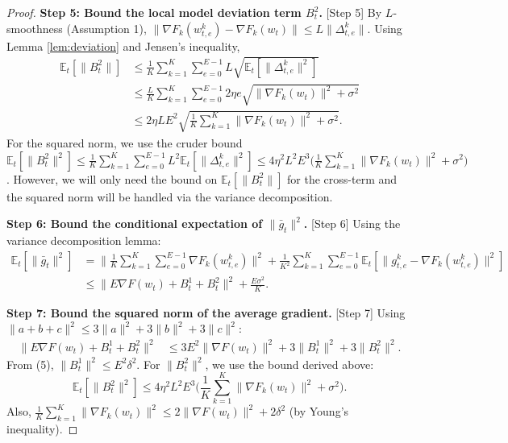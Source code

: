 \documentclass{article}
\begin{document}
\begin{proof}
\noindent \textbf{Step 5: Bound the local model deviation term $B_t^2$.} [Step 5]
By $L$-smoothness (Assumption 1), $\|\nabla F_k(w_{t,e}^k) - \nabla F_k(w_t)\| \le L \|\Delta_{t,e}^k\|$. Using Lemma \ref{lem:deviation} and Jensen's inequality,
\begin{align}
\mathbb{E}_t[\|B_t^2\|] &\le \frac{1}{K}\sum_{k=1}^K \sum_{e=0}^{E-1} L \sqrt{\mathbb{E}_t[\|\Delta_{t,e}^k\|^2]} \\
&\le \frac{L}{K}\sum_{k=1}^K \sum_{e=0}^{E-1} 2\eta e \sqrt{\|\nabla F_k(w_t)\|^2 + \sigma^2} \\
&\le 2\eta L E^2 \sqrt{ \frac{1}{K}\sum_{k=1}^K \|\nabla F_k(w_t)\|^2 + \sigma^2 }. \tag{6}
\end{align}
For the squared norm, we use the cruder bound $\mathbb{E}_t[\|B_t^2\|^2] \le \frac{1}{K}\sum_{k=1}^K \sum_{e=0}^{E-1} L^2 \mathbb{E}_t[\|\Delta_{t,e}^k\|^2] \le 4\eta^2 L^2 E^3 \Big( \frac{1}{K}\sum_{k=1}^K \|\nabla F_k(w_t)\|^2 + \sigma^2 \Big)$. However, we will only need the bound on $\mathbb{E}_t[\|B_t^2\|]$ for the cross-term and the squared norm will be handled via the variance decomposition.

\noindent \textbf{Step 6: Bound the conditional expectation of $\|\bar{g}_t\|^2$.} [Step 6]
Using the variance decomposition lemma:
\begin{align}
\mathbb{E}_t[\|\bar{g}_t\|^2] &= \Big\|\frac{1}{K}\sum_{k=1}^K \sum_{e=0}^{E-1} \nabla F_k(w_{t,e}^k)\Big\|^2 + \frac{1}{K^2}\sum_{k=1}^K \sum_{e=0}^{E-1} \mathbb{E}_t[\|g_{t,e}^k - \nabla F_k(w_{t,e}^k)\|^2] \\
&\le \Big\| E \nabla F(w_t) + B_t^1 + B_t^2 \Big\|^2 + \frac{E\sigma^2}{K}. \tag{7}
\end{align}

\noindent \textbf{Step 7: Bound the squared norm of the average gradient.} [Step 7]
Using $\|a+b+c\|^2 \le 3\|a\|^2 + 3\|b\|^2 + 3\|c\|^2$:
\begin{align}
\Big\| E \nabla F(w_t) + B_t^1 + B_t^2 \Big\|^2 
&\le 3E^2 \|\nabla F(w_t)\|^2 + 3\|B_t^1\|^2 + 3\|B_t^2\|^2. \tag{8}
\end{align}
From (5), $\|B_t^1\|^2 \le E^2 \delta^2$. For $\|B_t^2\|^2$, we use the bound derived above:
\begin{equation}
\mathbb{E}_t[\|B_t^2\|^2] \le 4\eta^2 L^2 E^3 \Big( \frac{1}{K}\sum_{k=1}^K \|\nabla F_k(w_t)\|^2 + \sigma^2 \Big). \tag{9}
\end{equation}
Also, $\frac{1}{K}\sum_{k=1}^K \|\nabla F_k(w_t)\|^2 \le 2\|\nabla F(w_t)\|^2 + 2\delta^2$ (by Young's inequality).


\end{proof}
\end{document}

